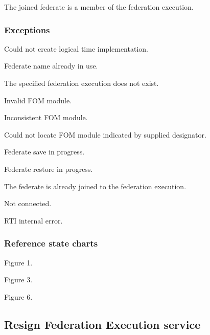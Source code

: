 \begin{stdalphalist}
    \item The joined federate is a member of the federation execution.
\end{stdalphalist}

\subsubsection{Exceptions}

\begin{stdalphalist}
    \item Could not create logical time implementation.
    \item Federate name already in use.
    \item The specified federation execution does not exist.
\end{stdalphalist}

\clearpage

\begin{stdalphalist}
    \setcounter{enumi}{3}
    \item Invalid FOM module.
    \item Inconsistent FOM module.
    \item Could not locate FOM module indicated by supplied designator.
    \item Federate save in progress.
    \item Federate restore in progress.
    \item The federate is already joined to the federation execution.
    \item Not connected.
    \item RTI internal error.
\end{stdalphalist}

\subsubsection{Reference state charts}

\begin{stdalphalist}
    \item Figure 1.
    \item Figure 3.
    \item Figure 6.
\end{stdalphalist}

\subsection{Resign Federation Execution service}

